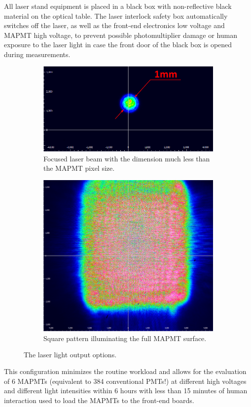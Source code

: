 All laser stand equipment is placed in a black box with non-reflective black material on the optical table. The laser interlock safety box automatically switches off the laser, as well as the front-end electronics low voltage and MAPMT high voltage, to prevent possible photomultiplier damage or human exposure to the laser light in case the front door of the black box is opened during measurements.

\begin{figure}[bt]
	\centering
	\begin{subfigure}[b]{0.628\linewidth}
		\includegraphics[width=\linewidth]{figures/beamspot.pdf}
		\caption{Focused laser beam with the dimension much less than the  MAPMT pixel size.}
		\label{fig:beamopt1}
	\end{subfigure}
	\begin{subfigure}[b]{0.354\linewidth}
		\includegraphics[width=\linewidth]{figures/beamsquare.pdf}
		\caption{Square pattern illuminating the full MAPMT surface.}
		\label{fig:beamopt2}
	\end{subfigure}
	\caption{The laser light output options.}
\end{figure}

This configuration minimizes the routine workload and allows for the evaluation of 6 MAPMTs (equivalent to 384 conventional PMTs!) at different high voltages and different light intensities within 6 hours with less than 15 minutes of human interaction used to load the MAPMTs to the front-end boards.

